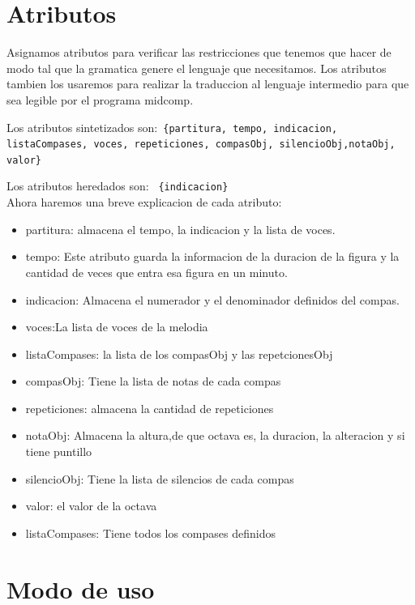 \documentclass[a4paper]{article}
\begin{document}
\section{Atributos}

Asignamos atributos para verificar las restricciones que tenemos que hacer de modo tal que la gramatica genere el lenguaje que necesitamos.
Los atributos tambien los usaremos para realizar la traduccion al lenguaje intermedio para que sea legible por el programa midcomp. \linebreak


Los atributos sintetizados son:\texttt{
\{partitura, tempo, indicacion, listaCompases, voces, repeticiones, compasObj, silencioObj,notaObj, valor\}
}\linebreak


Los atributos heredados son: 
\texttt{
\{indicacion\}
}\\  

Ahora haremos una breve explicacion de cada atributo:

\begin{itemize}
\item partitura: almacena el tempo, la indicacion y la lista de voces. 
\item tempo: Este atributo guarda la informacion de la duracion de la figura y la cantidad de veces que entra esa figura en un minuto.
\item indicacion: Almacena el numerador y el denominador definidos del compas.
\item voces:La lista de voces de la melodia
\item listaCompases: la lista de los compasObj y las repetcionesObj
\item compasObj: Tiene la lista de notas  de cada compas
\item repeticiones: almacena la cantidad de repeticiones
\item notaObj: Almacena la altura,de que octava es, la duracion, la alteracion y si tiene puntillo
\item silencioObj: Tiene la lista de silencios de cada compas
\item valor: el valor de la octava 
\item listaCompases: Tiene todos los compases definidos

\end{itemize}

\section{Modo de uso}
\end{document}
